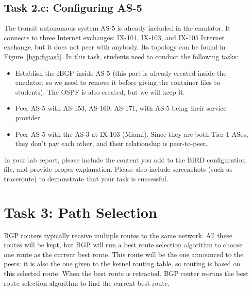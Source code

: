 \subsection{Task 2.c: Configuring AS-5} 

The transit autonomous system AS-5 is already included in the emulator. 
It connects to three 
Internet exchanges: IX-101, IX-103, and IX-105 Internet exchange,
but it does not peer with anybody. Its topology can be found 
in Figure~\ref{bgp:fig:as5}.
In this task, students need to conduct the following tasks:

\begin{itemize}[noitemsep]
  \item Establish the IBGP inside AS-5 (this part is already created 
    inside the emulator, so we need to remove it before giving the container 
    files to students). The OSPF is also created, but we will keep it. 

  \item Peer AS-5 with AS-153, AS-160, AS-171, with AS-5 being their service provider.

  \item Peer AS-5 with the AS-3 at IX-103 (Miami). Since they are both Tier-1 ASes,
    they don't pay each other, and their relationship is peer-to-peer.
\end{itemize}


In your lab report, please include the content you add to the 
BIRD configuration file, and provide proper explanation.
Please also include screenshots (such as traceroute) to demonstrate 
that your task is successful. 


\section{Task 3: Path Selection} 

BGP routers typically receive multiple routes to the same network. 
All these routes will be kept, but BGP will run a best route 
selection algorithm to choose one route as the current best route. 
This route will be the one announced to the peers; 
it is also the one given to the kernel routing table, 
so routing is based on this selected route. 
When the best route is retracted, BGP router re-runs the 
best route selection algorithm to find the current best route. 


